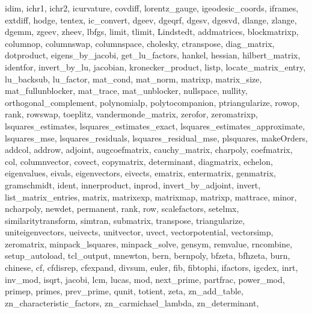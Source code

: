 {{    idim,
    ichr1,
    ichr2,
    icurvature,
    covdiff,
    lorentz_gauge,
    igeodesic_coords,
    iframes,
    extdiff,
    hodge,
    tentex,
    ic_convert,
    dgeev,
    dgeqrf,
    dgesv,
    dgesvd,
    dlange,
    zlange,
    dgemm,
    zgeev,
    zheev,
    lbfgs,
    limit,
    tlimit,
    Lindstedt,
    addmatrices,
    blockmatrixp,
    columnop,
    columnswap,
    columnspace,
    cholesky,
    ctranspose,
    diag_matrix,
    dotproduct,
    eigens_by_jacobi,
    get_lu_factors,
    hankel,
    hessian,
    hilbert_matrix,
    identfor,
    invert_by_lu,
    jacobian,
    kronecker_product,
    listp,
    locate_matrix_entry,
    lu_backsub,
    lu_factor,
    mat_cond,
    mat_norm,
    matrixp,
    matrix_size,
    mat_fullunblocker,
    mat_trace,
    mat_unblocker,
    nullspace,
    nullity,
    orthogonal_complement,
    polynomialp,
    polytocompanion,
    ptriangularize,
    rowop,
    rank,
    rowswap,
    toeplitz,
    vandermonde_matrix,
    zerofor,
    zeromatrixp,
    lsquares_estimates,
    lsquares_estimates_exact,
    lsquares_estimates_approximate,
    lsquares_mse,
    lsquares_residuals,
    lsquares_residual_mse,
    plsquares,
    makeOrders,
    addcol,
    addrow,
    adjoint,
    augcoefmatrix,
    cauchy_matrix,
    charpoly,
    coefmatrix,
    col,
    columnvector,
    covect,
    copymatrix,
    determinant,
    diagmatrix,
    echelon,
    eigenvalues,
    eivals,
    eigenvectors,
    eivects,
    ematrix,
    entermatrix,
    genmatrix,
    gramschmidt,
    ident,
    innerproduct,
    inprod,
    invert_by_adjoint,
    invert,
    list_matrix_entries,
    matrix,
    matrixexp,
    matrixmap,
    matrixp,
    mattrace,
    minor,
    ncharpoly,
    newdet,
    permanent,
    rank,
    row,
    scalefactors,
    setelmx,
    similaritytransform,
    simtran,
    submatrix,
    transpose,
    triangularize,
    uniteigenvectors,
    ueivects,
    unitvector,
    uvect,
    vectorpotential,
    vectorsimp,
    zeromatrix,
    minpack_lsquares,
    minpack_solve,
    gensym,
    remvalue,
    rncombine,
    setup_autoload,
    tcl_output,
    mnewton,
    bern,
    bernpoly,
    bfzeta,
    bfhzeta,
    burn,
    chinese,
    cf,
    cfdisrep,
    cfexpand,
    divsum,
    euler,
    fib,
    fibtophi,
    ifactors,
    igcdex,
    inrt,
    inv_mod,
    isqrt,
    jacobi,
    lcm,
    lucas,
    mod,
    next_prime,
    partfrac,
    power_mod,
    primep,
    primes,
    prev_prime,
    qunit,
    totient,
    zeta,
    zn_add_table,
    zn_characteristic_factors,
    zn_carmichael_lambda,
    zn_determinant,
}}
